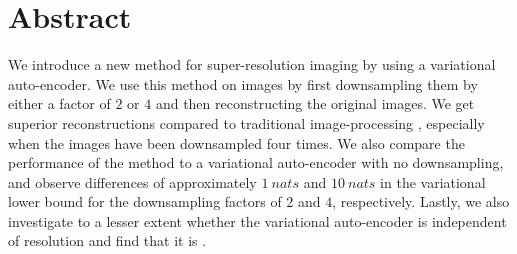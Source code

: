 \section*{Abstract}
\label{sec:abstract}

We introduce a new method for super-resolution imaging by using a variational auto-encoder.
We use this method on images by first downsampling them by either a factor of $2$ or $4$ and then reconstructing the original images.
We get superior reconstructions compared to traditional image-processing , especially when the images have been downsampled four times.
We also compare the performance of the method to a variational auto-encoder with no downsampling, and observe differences of approximately $\SI{1}{nats}$ and $\SI{10}{nats}$ in the variational lower bound for the downsampling factors of $2$ and $4$, respectively.
Lastly, we also investigate to a lesser extent whether the variational auto-encoder is independent of resolution and find that it is .
